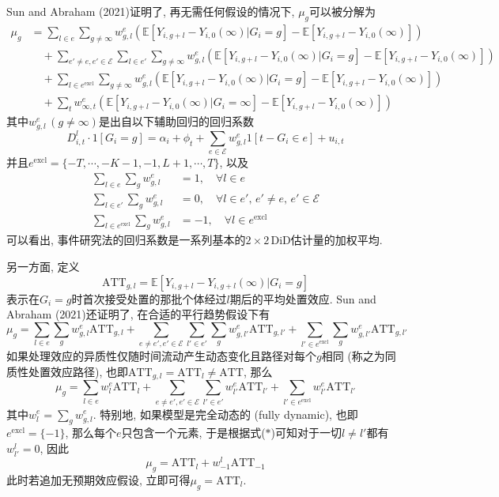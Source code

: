 \documentclass[cn,sakura,14pt,screen,bibstyle=gb7714-2015,math=mtpro2]{elegantnote}
\newcommand{\E}{\mathbb{E}}
\begin{document}
Sun and Abraham (2021)证明了, 再无需任何假设的情况下, $\mu_g$可以被分解为
\begin{align*}
\mu_g&=\sum_{l\in e}\sum_{g\neq\infty}w_{g,l}^e(\E[Y_{i,g+l}-Y_{i,0}(\infty)|G_i=g]-\E[Y_{i,g+l}-Y_{i,0}(\infty)]) \\
&\quad+\sum_{e'\neq e,e'\in\mathcal{E}}\sum_{l\in e'}\sum_{g\ne\infty}w_{g,l}^e(\E[Y_{i,g+l}-Y_{i,0}(\infty)|G_i=g]-\E[Y_{i,g+l}-Y_{i,0}(\infty)]) \\
&\quad +\sum_{l\in e^\text{excl}}\sum_{g\ne\infty}w_{g,l}^e(\E[Y_{i,g+l}-Y_{i,0}(\infty)|G_i=g]-\E[Y_{i,g+l}-Y_{i,0}(\infty)]) \\
&\quad+ \sum_tw_{\infty,t}^e(\E[Y_{i,g+l}-Y_{i,0}(\infty)|G_i=\infty]-\E[Y_{i,g+l}-Y_{i,0}(\infty)])
\end{align*}
其中$w_{g,l}^e\,(g\neq\infty)$是出自以下辅助回归的回归系数
$$D_{i,t}^l\cdot1[G_i=g]=\alpha_i+\phi_t+\sum_{e\in\mathcal{E}}w_{g,l}^e1[t-G_i\in e]+u_{i,t}$$
并且$e^\text{excl}=\{-T,\cdots,-K-1,-1,L+1,\cdots,T\}$, 以及
\begin{align}
\sum_{l\in e}\sum_gw_{g,l}^e&=1,\quad\forall l\in e \nonumber \\
\sum_{l\in e'}\sum_gw_{g,l}^e&=0,\quad \forall l\in e',\, e'\neq e,\, e'\in\mathcal{E} \tag{$\ast$} \\
\sum_{l\in e^\text{excl}}\sum_gw_{g,l}^e&=-1,\quad\forall l\in e^\text{excl} \nonumber
\end{align}
可以看出, 事件研究法的回归系数是一系列基本的$2\times 2\,$DiD估计量的加权平均. 

另一方面, 定义
$$\text{ATT}_{g,l}=\E[Y_{i,g+l}-Y_{i,g+l}(\infty)|G_i=g]$$
表示在$G_i=g$时首次接受处置的那批个体经过$l$期后的平均处置效应. Sun and Abraham (2021)还证明了, 在合适的平行趋势假设下有
$$\mu_g=\sum_{l\in e}\sum_gw_{g,l}^e\text{ATT}_{g,l}+\sum_{e\neq e',e'\in\mathcal{E}}\sum_{l'\in e'}\sum_g w_{g,l'}^e\text{ATT}_{g,l'}+\sum_{l'\in e^\text{excl}}\sum_gw_{g,l'}^e\text{ATT}_{g,l'}$$
如果处理效应的异质性仅随时间流动产生动态变化且路径对每个$g$相同 (称之为同质性处置效应路径), 也即$\text{ATT}_{g,l}=\text{ATT}_l\neq \text{ATT}$, 那么
$$\mu_g=\sum_{l\in e}w_{l}^e\text{ATT}_l+\sum_{e\neq e',e'\in\mathcal{E}}\sum_{l'\in e'} w_{l'}^e\text{ATT}_{l'}+\sum_{l'\in e^\text{excl}}w_{l'}^e\text{ATT}_{l'}$$
其中$w_l^e=\sum_gw_{g,l}^e$. 特别地, 如果模型是完全动态的 (fully dynamic), 也即$e^\text{excl}=\{-1\}$, 那么每个$e$只包含一个元素, 于是根据式($\ast$)可知对于一切$l\neq l'$都有$w_{l'}^l=0$, 因此
$$\mu_g=\text{ATT}_l+w_{-1}^l\text{ATT}_{-1}$$
此时若追加无预期效应假设, 立即可得$\mu_g=\text{ATT}_l$.
\end{document}
